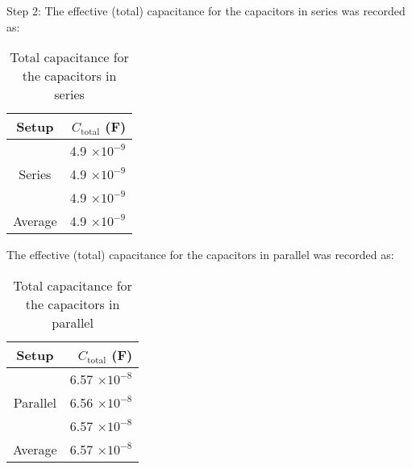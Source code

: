 \documentclass [12pt, letterpaper, twoside] {article}
\begin{document}
\noindent
Step 2:
The effective (total) capacitance for the capacitors in series was recorded as:
\begin{table}[h!]
  \centering
  \begin{tabular}{| c | r |}
    \hline\hline
    Setup & \(C_{\text{total}}\) (F) \\
    \hline
    \multirow {3}{*}{Series} & 4.9 \(\times{10}^{-9}\) \\
    & 4.9 \(\times{10}^{-9}\) \\
    & 4.9 \(\times{10}^{-9}\) \\
    \hline
    Average & 4.9 \(\times{10}^{-9}\) \\
    \hline\hline
  \end{tabular}
  \caption{Total capacitance for the capacitors in series}
\end{table}

\noindent
The effective (total) capacitance for the capacitors in parallel was recorded as:
\begin{table}[h!]
  \centering
  \begin{tabular}{| c | r |}
    \hline\hline
    Setup & \(C_{\text{total}}\) (F) \\
    \hline
    \multirow {3}{*}{Parallel} & 6.57 \(\times{10}^{-8}\) \\
    & 6.56 \(\times{10}^{-8}\) \\
    & 6.57 \(\times{10}^{-8}\) \\
    \hline
    Average & 6.57 \(\times{10}^{-8}\) \\ %
    \hline\hline
  \end{tabular}
  \caption{Total capacitance for the capacitors in parallel}
\end{table}
\end{document}
